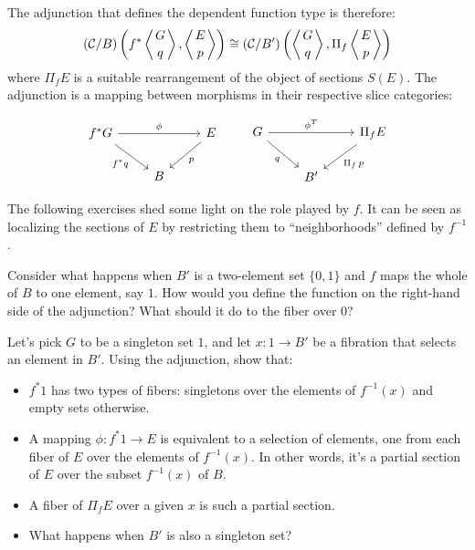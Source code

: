 \documentclass[DaoFP]{subfiles}
\begin{document}
The adjunction that defines the dependent function type is therefore:
\[ (\mathcal{C}/B) \left( f^* \left \langle {G \atop q} \right \rangle, \left \langle {E \atop p} \right \rangle \right) \cong  (\mathcal{C}/B')\left( \left \langle {G \atop q} \right \rangle, \Pi_f \left \langle {E \atop p } \right \rangle \right) \]
where $\Pi_f E$ is a suitable rearrangement of the object of sections $S(E)$. The adjunction is a mapping between morphisms in their respective slice categories:

\[
 \begin{tikzcd}
 f^* G
 \arrow[rr, "\phi"]
 \arrow[rd, "f^* q"']
 &&E
 \arrow[dl, "p"]
 \\
 &B
 \end{tikzcd}
 \hspace{20pt}
\begin{tikzcd}
 G
 \arrow[rr, "\phi^T"]
 \arrow[rd, "q"']
 && \Pi_f E
 \arrow[ld, "\Pi_f \, p"]
 \\
 & B'
  \end{tikzcd}
\]

The following exercises shed some light on the role played by $f$. It can be seen as localizing the sections of $E$ by restricting them to ``neighborhoods'' defined by $f^{-1}$.

\begin{exercise}
Consider what happens when $B'$ is a two-element set $\{0, 1\}$ and $f$ maps the whole of $B$ to one element, say $1$. How would you define the function on the right-hand side of the adjunction? What should it do to the fiber over $0$?
\end{exercise}

\begin{exercise}
Let's pick $G$ to be a singleton set $1$, and let $x \colon 1 \to B'$ be a fibration that selects an element in $B'$. Using the adjunction, show that:
\begin{itemize}
\item $f^* 1$ has two types of fibers: singletons over the elements of $f^{-1} (x)$ and empty sets otherwise. 
\item A mapping $\phi \colon f^* 1 \to E$ is equivalent to a selection of elements, one from each fiber of $E$ over the elements of $f^{-1}(x)$. In other words, it's a partial section of $E$ over the subset $f^{-1}(x)$ of $B$.
\item A fiber of $\Pi_f E$ over a given $x$ is such a partial section. 
\item What happens when $B'$ is also a singleton set?
\end{itemize}
\end{exercise}
\end{document}
